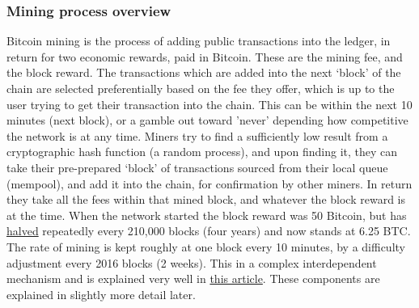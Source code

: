 \subsubsection{Mining process overview}
Bitcoin mining is the process of adding public transactions into the ledger, in return for two economic rewards, paid in Bitcoin. These are the mining fee, and the block reward. The transactions which are added into the next `block' of the chain are selected preferentially based on the fee they offer, which is up to the user trying to get their transaction into the chain. This can be within the next 10 minutes (next block), or a gamble out toward 'never' depending how competitive the network is at any time. Miners try to find a sufficiently low result from a cryptographic hash function \cite{rogaway2004cryptographic}(a random process), and upon finding it, they can take their pre-prepared `block' of transactions sourced from their local queue (mempool), and add it into the chain, for confirmation by other miners. In return they take all the fees within that mined block, and whatever the block reward is at the time. When the network started the block reward was 50 Bitcoin, but has \href{https://ma.ttias.be/dissecting-code-bitcoin-halving/}{halved} repeatedly every 210,000 blocks (four years) and now stands at 6.25 BTC. The rate of mining is kept roughly at one block every 10 minutes, by a difficulty adjustment every 2016 blocks (2 weeks). This in a complex interdependent mechanism and is explained very well in \href{https://bitcoinmagazine.com/technical/how-mining-protects-the-bitcoin-network}{this article}. These components are explained in slightly more detail later.\par
